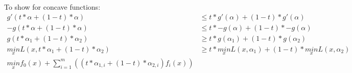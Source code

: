 To show for concave functions:
\begin{align*}
g'(t*\alpha+(1-t)*\alpha) &\le t*g'(\alpha)+(1-t)*g'(\alpha)  \\
-g(t*\alpha+(1-t)*\alpha) &\le t*-g(\alpha)+(1-t)*-g(\alpha) \\
g(t*\alpha_1+(1-t)*\alpha_2) &\ge t*g(\alpha_1)+(1-t)*g(\alpha_2) \\
\underset{x}{min} L(x,t*\alpha_1+(1-t)*\alpha_2) &\ge
t*\underset{x}{min} L(x,\alpha_1)+(1-t)*\underset{x}{min} L(x,\alpha_2)\\
\underset{x}{min} f_0(x) + \sum_{i=1}^{m}((t*\alpha_{1,i}+(1-t)*\alpha_{2,i}) f_i(x)) 
\end{align*}
